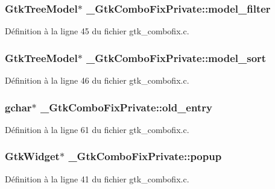 \subsubsection[{model\_\-filter}]{\setlength{\rightskip}{0pt plus 5cm}GtkTreeModel$\ast$ {\bf \_\-GtkComboFixPrivate::model\_\-filter}}\label{struct__GtkComboFixPrivate_a9052f2bd735cf85d7fc8af474e8234f4}


Définition à la ligne 45 du fichier gtk\_\-combofix.c.

\subsubsection[{model\_\-sort}]{\setlength{\rightskip}{0pt plus 5cm}GtkTreeModel$\ast$ {\bf \_\-GtkComboFixPrivate::model\_\-sort}}\label{struct__GtkComboFixPrivate_a1fb24ae13e52c08ca5a3eec0e664eb47}


Définition à la ligne 46 du fichier gtk\_\-combofix.c.

\subsubsection[{old\_\-entry}]{\setlength{\rightskip}{0pt plus 5cm}gchar$\ast$ {\bf \_\-GtkComboFixPrivate::old\_\-entry}}\label{struct__GtkComboFixPrivate_a10c278e9af2d0ec88c1ef39bc383d5c0}


Définition à la ligne 61 du fichier gtk\_\-combofix.c.

\subsubsection[{popup}]{\setlength{\rightskip}{0pt plus 5cm}GtkWidget$\ast$ {\bf \_\-GtkComboFixPrivate::popup}}\label{struct__GtkComboFixPrivate_a8145a3da30ddc400dea57fad08c50724}


Définition à la ligne 41 du fichier gtk\_\-combofix.c.

